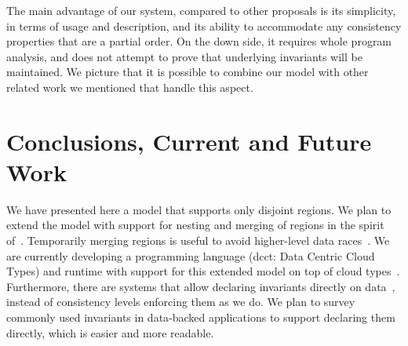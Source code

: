\documentclass[preprint,numbers]{sigplanconf}
\begin{document}


The main advantage of our system, compared to other proposals is its simplicity,
in terms of usage and description, and its ability to accommodate any consistency
properties that are a partial order. On the down side, it requires whole program analysis,
and does not attempt to prove that underlying invariants will be maintained. We
picture that it is possible to combine our model with other related work we
mentioned that handle this aspect.

\section{Conclusions, Current and Future Work}
\label{sec:conclusion}
We have presented here a model that supports only disjoint regions. We plan to
extend the model with support for nesting and merging of regions in the spirit of~\cite{dolby2012data}.
Temporarily merging regions is useful to avoid higher-level data races~\cite{artho2003high}. We are
currently developing a programming language (dcct: Data Centric Cloud Types) and runtime with 
support for this extended model on top of cloud types~\cite{burckhardt2012cloud}. Furthermore, 
there are systems that allow declaring invariants directly on data~\cite{bailis2015feral}, instead of 
consistency levels enforcing them as we do. We plan to survey commonly used
invariants in data-backed applications to support declaring them directly, which
is easier and more readable.








\end{document}
